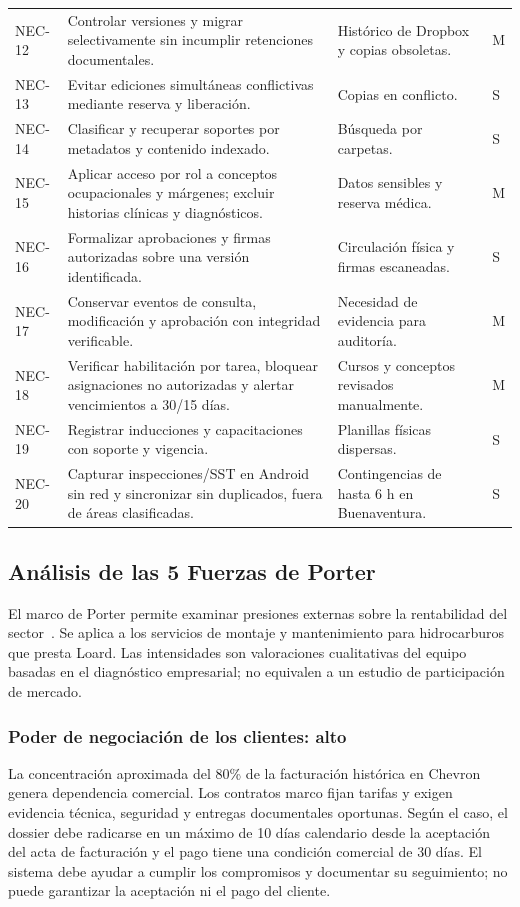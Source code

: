 \documentclass[12pt,letterpaper]{article}
\newcommand{\nec}[1]{\mbox{NEC-#1}}                       %
\begin{document}
{\begin{longtable}{@{}L{1.8cm}L{7.2cm}L{4.6cm}L{1.2cm}@{}}
\nec{12} & Controlar versiones y migrar selectivamente sin incumplir retenciones documentales. & Histórico de Dropbox y copias obsoletas. & M\\
\nec{13} & Evitar ediciones simultáneas conflictivas mediante reserva y liberación. & Copias en conflicto. & S\\
\nec{14} & Clasificar y recuperar soportes por metadatos y contenido indexado. & Búsqueda por carpetas. & S\\
\nec{15} & Aplicar acceso por rol a conceptos ocupacionales y márgenes; excluir historias clínicas y diagnósticos. & Datos sensibles y reserva médica. & M\\
\nec{16} & Formalizar aprobaciones y firmas autorizadas sobre una versión identificada. & Circulación física y firmas escaneadas. & S\\
\nec{17} & Conservar eventos de consulta, modificación y aprobación con integridad verificable. & Necesidad de evidencia para auditoría. & M\\
\nec{18} & Verificar habilitación por tarea, bloquear asignaciones no autorizadas y alertar vencimientos a 30/15 días. & Cursos y conceptos revisados manualmente. & M\\
\nec{19} & Registrar inducciones y capacitaciones con soporte y vigencia. & Planillas físicas dispersas. & S\\
\nec{20} & Capturar inspecciones/SST en Android sin red y sincronizar sin duplicados, fuera de áreas clasificadas. & Contingencias de hasta 6 h en Buenaventura. & S\\
\end{longtable}
}

\subsection{Análisis de las 5 Fuerzas de Porter}
\label{sec:porter-loard}
El marco de Porter permite examinar presiones externas sobre la rentabilidad del sector~\cite{hbs-cinco-fuerzas}. Se aplica a los servicios de montaje y mantenimiento para hidrocarburos que presta Loard. Las intensidades son valoraciones cualitativas del equipo basadas en el diagnóstico empresarial; no equivalen a un estudio de participación de mercado.

\subsubsection{Poder de negociación de los clientes: alto}
La concentración aproximada del 80\% de la facturación histórica en Chevron genera dependencia comercial. Los contratos marco fijan tarifas y exigen evidencia técnica, seguridad y entregas documentales oportunas. Según el caso, el dossier debe radicarse en un máximo de 10 días calendario desde la aceptación del acta de facturación y el pago tiene una condición comercial de 30 días. El sistema debe ayudar a cumplir los compromisos y documentar su seguimiento; no puede garantizar la aceptación ni el pago del cliente.
\end{document}
